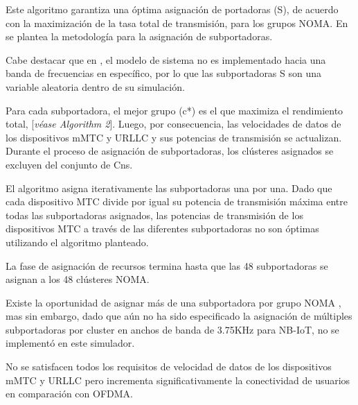 Este algoritmo garantiza una óptima asignación de portadoras (S), de acuerdo con la maximización de la tasa total de transmisión, para los grupos NOMA. En \parencite{Shahini2019} se plantea la metodología para la asignación de subportadoras. \newline

Cabe destacar que en \parencite{Shahini2019}, el modelo de sistema no es implementado hacia una banda de frecuencias en específico, por lo que las subportadoras S son una variable aleatoria dentro de su simulación.\newline

Para cada subportadora, el mejor grupo (c*) es el que maximiza el rendimiento total, [\textit{véase Algorithm 2}]. Luego, por consecuencia, las velocidades de datos de los dispositivos mMTC y URLLC y sus potencias de transmisión se actualizan. Durante el proceso de asignación de subportadoras, los clústeres asignados se excluyen del conjunto de Cns. \newline

El algoritmo asigna iterativamente las subportadoras una por una. Dado que cada dispositivo MTC divide por igual su potencia de transmisión máxima entre todas las subportadoras asignados, las potencias de transmisión de los dispositivos MTC a través de las diferentes subportadoras no son óptimas utilizando el algoritmo planteado. \newline

La fase de asignación de recursos termina hasta que las 48 subportadoras se asignan a los 48 clústeres NOMA. \newline

Existe la oportunidad de asignar más de una subportadora por grupo NOMA , mas sin embargo, dado que aún no ha sido especificado la asignación de múltiples subportadoras por cluster en anchos de banda de 3.75KHz para NB-IoT, no se implementó en este simulador. \newline

No se satisfacen todos los requisitos de velocidad de datos de los dispositivos mMTC y URLLC pero incrementa significativamente la conectividad de usuarios en comparación con OFDMA.\newline


